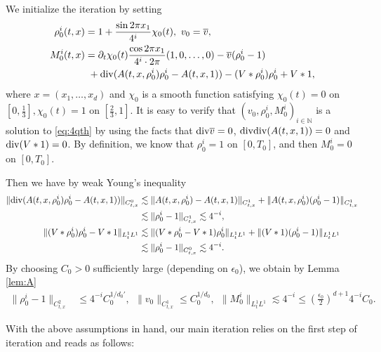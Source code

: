 \documentclass[UTF-8,reqno]{amsart}
\numberwithin{equation}{section}
\theoremstyle{definition}
\def\mN{{\mathbb N}}
\def\leq{\leqslant}
\def\div{\mathord{{\rm div}}}
\def\leq{\leqslant}
\def\div{\mathord{{\rm div}}}
\begin{document}
We initialize the iteration by setting
\begin{align*}
\rho_0^i(t,x)
&=
1+\frac{\sin2\pi x_1}{4^i}\chi_0(t),
 \ 
v_0=\overline v,\\
M_0^i(t,x)
&=
\partial_t\chi_0(t)\frac{\cos2\pi x_1}{4^i\cdot 2\pi}(1,0,\dots,0)
-\overline v(\rho_0^i-1)\\
&\ +
\div(A(t,x,\rho_0^i) \rho_0^i-A(t,x,1))-(V*\rho_0^i)\rho_0^i+V*1,
\end{align*}
where $x=(x_1,\dots,x_d)$ and $\chi_0$ is a smooth function satisfying
$
\chi_0(t)=0 $ on $
 [0,\frac13 ], \chi_0(t)=1$ on $[\frac23,1 ].
$   It is easy to verify that $(v_0,\rho^{i}_0,  M^{i}_0)_{i\in\mN}$ is a solution to \eqref{eq:4qth} by using the facts that $\div \overline v=0$, $\div\div(A(t,x,1))=0$ and $\div(V*1)=0$. By definition, we know that $\rho_0^i=1$ on $[0,T_0]$, and then $M_0^i=0$ on $[0,T_0]$.

Then   we have by weak Young's inequality
\begin{align*}
  \|  \div(A(t,x,\rho_0^i) \rho_0^i-A(t,x,1))\|_{C_{t,x}^0}&\lesssim \|   A(t,x,\rho_0^i) -A(t,x,1)\|_{C_{t,x}^1}+\|  A(t,x,\rho_0^i) (\rho_0^i-1) \|_{C_{t,x}^1}\\
  &\lesssim \|\rho_0^i-1 \|_{C_{t,x}^1}\lesssim 4^{-i},\\
\|(V*\rho_0^i)\rho_0^i-V*1\|_{L_{t}^1L^1}&\lesssim \|(V*\rho_0^i-V*1)\rho_0^i\|_{L_{t}^1L^1}+\|( V*1)(\rho_0^i-1)\|_{L_{t}^1L^1}\\
&\lesssim \|\rho_0^i-1 \|_{C_{t,x}^0}\lesssim 4^{-i}.
\end{align*} By choosing $C_0>0$ sufficiently large (depending on $\epsilon_0$), we obtain by Lemma \ref{lem:A}
\begin{align}
\| \rho_0^i-1\|_{C_{t,x}^2}
& 
\leq
4^{-i}C_0^{1/d_0'},\ \ \|v_0\|_{C_{t,x}^1}\leq C_0^{1/d_0},
\ \
\|M_0^i\|_{L_t^1L^1}
\lesssim
4^{-i}
\leq
(\frac{\epsilon_0}{2})^{d+1}4^{-i}C_0.
\label{bd:4rho_0,M_0}
\end{align} 

 

With the above assumptions in hand, our main iteration relies on the first step of iteration and reads as follows:
\end{document}
